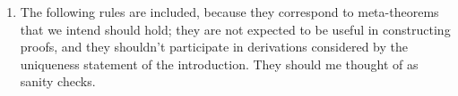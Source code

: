\documentclass[11pt]{article}
\newcommand{\equality}{=}
\newcommand{\hastype}{\vcentcolon}
\newcommand{\TYPE}{\mathop{\text{ \sc type}}}
\newcommand{\Context}{\vdash}
\newcommand{\var}{\char`_}
\begin{document}
\begin{enumerate}
\begin{mathparpagebreakable}
\end{mathparpagebreakable}


\item
The following rules are included, because they correspond to meta-theorems that
we intend should hold; they are not expected to be useful in constructing
proofs, and they shouldn't participate in derivations considered by the
uniqueness statement of the introduction.  They should me thought of as sanity
checks.


\end{enumerate}



\end{document}
